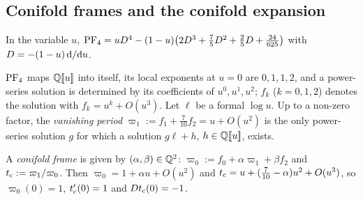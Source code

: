 \subsection{Conifold frames and the conifold expansion}
\label{sec:set-frames}

In the variable $u$, $\mathrm{PF}_{4}=uD^4-(1-u)\bigl(2D^3+\frac75D^2+\frac25D+\frac{24}{625}\bigr)$ with $D=-(1-u)\,\mathrm{d}/\mathrm{d} u$.

\begin{lem}
\label{lem:set-frobbasis}
$\mathrm{PF}_{4}$ maps $\mathbb{Q}[\![ u ]\!]$ into itself, its local exponents at $u=0$ are $0,1,1,2$, and a power-series solution is determined by its coefficients of $u^0,u^1,u^2$; $f_k$ ($k=0,1,2$) denotes the solution with $f_k=u^k+O(u^3)$. Let $\ell$ be a formal $\log u$. Up to a non-zero factor, the \emph{vanishing period} $\varpi_1:=f_1+\frac7{10}f_2=u+O(u^2)$ is the only power-series solution $g$ for which a solution $g\ell+h$, $h\in\mathbb{Q}[\![ u ]\!]$, exists.
\end{lem}

\begin{defn}
\label{def:set-frames}
A \emph{conifold frame} is given by $(\alpha,\beta)\in\mathbb{Q}^2$: $\varpi_0:=f_0+\alpha\varpi_1+\beta f_2$ and $t_{\mathrm{c}}:=\varpi_1/\varpi_0$. Then $\varpi_0=1+\alpha u+O(u^2)$ and $t_{\mathrm{c}}=u+(\frac7{10}-\alpha)u^2+O(u^3)$, so $\varpi_0(0)=1$, $t_{\mathrm{c}}'(0)=1$ and $Dt_{\mathrm{c}}(0)=-1$.
\end{defn}

